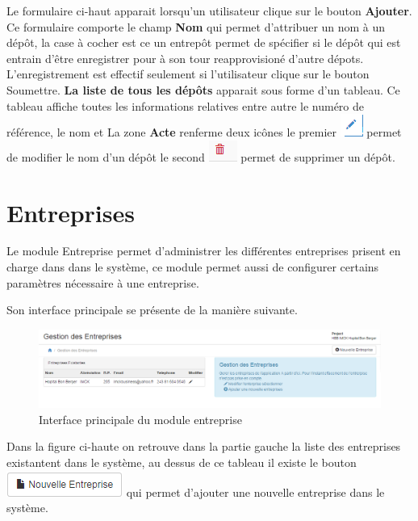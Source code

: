 \documentclass[12pt,a4paper]{report}
\begin{document}
Le formulaire ci-haut apparait lorsqu'un utilisateur clique sur le bouton \textbf{Ajouter}. Ce formulaire comporte le champ \textbf{Nom} qui permet d'attribuer un nom à un dépôt, la case à cocher est ce un entrepôt permet de spécifier si le dépôt qui est entrain d'être enregistrer pour à son tour reapprovisioné d'autre dépots.
L'enregistrement est effectif seulement si l'utilisateur clique sur le bouton Soumettre. \textbf{La liste de tous les dépôts} apparait sous forme d'un tableau. Ce tableau affiche toutes les informations relatives entre autre le numéro de référence, le nom et La zone \textbf{Acte} renferme deux icônes le premier \includegraphics[scale=0.7]{pic/EditUser.png}  permet de modifier le nom d'un dépôt le second \includegraphics[scale=0.7]{pic/DeleteWRed.png} permet de supprimer un dépôt.

\newpage
\section{Entreprises}
Le module Entreprise permet d'administrer les différentes entreprises prisent en charge dans dans le système, ce module permet aussi de configurer certains paramètres nécessaire à une entreprise.

Son interface principale se présente de la manière suivante.

\begin{figure}[h]
\begin{center}
\includegraphics[width=14cm]{pic/ModuleEntreprise.png}
\end{center}
\caption{Interface principale du module entreprise}
\label{Interface principale du module entreprise}
\end{figure} 

Dans la figure ci-haute on retrouve dans la partie gauche la liste des entreprises existantent dans le système, au dessus de ce tableau il existe le bouton \includegraphics[scale=1]{pic/New_Entre.png} qui permet d'ajouter une nouvelle entreprise dans le système.
\end{document}
